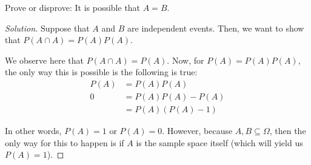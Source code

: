 \documentclass{article}
\newenvironment{solution}{\begin{proof}[Solution]}{\end{proof}}
\begin{document}
\begin{hw}
	Prove or disprove: It is possible that $A=B$.
\end{hw}
\begin{solution}
	Suppose that $A$ and $B$ are independent events. Then, we want to show that $P(A \cap A) = P(A)P(A)$.
	
	We observe here that $P(A \cap A) = P(A)$. Now, for $P(A) = P(A)P(A)$, the only way this is possible is the following is true:
	\begin{align*}
		P(A) &= P(A)P(A) \\
		0 &= P(A)P(A) - P(A) \\
		&= P(A)(P(A) - 1)
	\end{align*}

	In other words, $P(A) = 1$ or $P(A) = 0$. However, because $A, B \subseteq \Omega$, then the only way for this to happen is if $A$ is the sample space itself (which will yield us $P(A) = 1$).
\end{solution}
\end{document}
